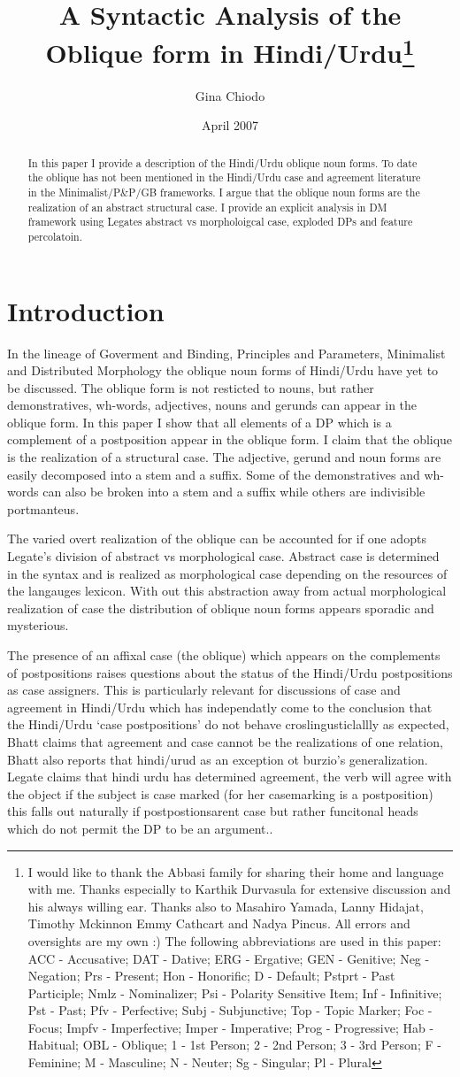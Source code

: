 \documentclass{article}
\author{Gina Chiodo}
\title {A Syntactic Analysis of the Oblique form in Hindi/Urdu\thanks{I would like to thank the Abbasi family for sharing their home and language with me. Thanks especially to Karthik Durvasula for extensive discussion and his always willing ear. Thanks also to Masahiro Yamada, Lanny Hidajat, Timothy Mckinnon Emmy Cathcart and Nadya Pincus. All errors and oversights are my own :) The following abbreviations are used in this paper:
ACC - Accusative;
DAT - Dative;
ERG - Ergative;
GEN - Genitive;
Neg - Negation;
Prs - Present;
Hon - Honorific;
D - Default;
Pstprt - Past Participle;
Nmlz - Nominalizer;
Psi - Polarity Sensitive Item;
Inf - Infinitive;
Pst - Past;
Pfv - Perfective;
Subj - Subjunctive;
Top - Topic Marker;
Foc - Focus;
Impfv - Imperfective;
Imper -  Imperative;
Prog - Progressive;
Hab - Habitual;
OBL - Oblique;
1 - 1st Person;
2 - 2nd Person;
3 - 3rd Person;
F - Feminine;
M - Masculine;
N - Neuter;
Sg - Singular;
Pl - Plural}}
\date{April 2007}
\begin{document}
%
\maketitle

 \begin{abstract}In this paper I provide a description of the Hindi/Urdu oblique noun forms. To date the oblique has not been mentioned in the Hindi/Urdu case and agreement literature in the Minimalist/P\&P/GB frameworks. I argue that the oblique noun forms are the realization of an abstract structural case. I provide an explicit analysis in DM framework using Legates abstract vs morpholoigcal case, exploded DPs and feature percolatoin.
\end{abstract}

\tableofcontents

\section{Introduction}

In the lineage of Goverment and Binding, Principles and Parameters, Minimalist and Distributed Morphology the oblique noun forms of Hindi/Urdu have yet to be discussed. The oblique form is not resticted to nouns, but rather demonstratives, wh-words, adjectives, nouns and gerunds can appear in the oblique form. In this paper I show that all elements of a DP which is a complement of a postposition appear in the oblique form. I claim that the oblique is the realization of a structural case. The adjective, gerund and noun forms are easily decomposed into a stem and a suffix. Some of the demonstratives and wh-words can also be broken into a stem and a suffix while others are indivisible portmanteus.

The varied overt realization of the oblique can be accounted for if one adopts Legate's division of abstract vs morphological case. Abstract case is determined in the syntax and is realized as morphological case depending on the resources of the langauges lexicon. With out this abstraction away from actual morphological realization of case the distribution of oblique noun forms appears sporadic and mysterious.

The presence of an affixal case (the oblique) which appears on the complements of postpositions raises questions about the status of the Hindi/Urdu postpositions as case assigners. This is particularly relevant for discussions of case and agreement in Hindi/Urdu which has independatly come to the conclusion that the Hindi/Urdu `case postpositions' do not behave croslingusticlallly as expected, Bhatt claims that agreement and case cannot be the realizations of one relation, Bhatt also reports that hindi/urud as an exception ot burzio's generalization. Legate claims that hindi urdu has determined agreement, the verb will agree with the object if the subject is case marked (for her casemarking is a postposition) this falls out naturally if postpostionsarent case but rather funcitonal heads which do not permit the DP to be an argument..
\end{document}
